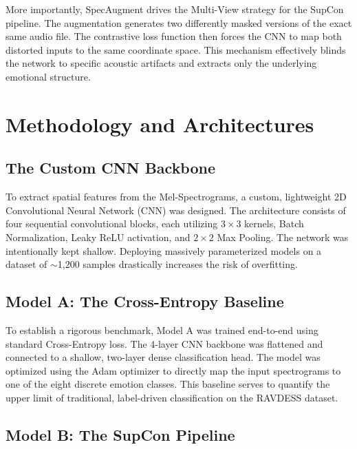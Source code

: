 \documentclass[12pt,hitec]{report}
\begin{document}
More importantly, SpecAugment drives the Multi-View strategy for the SupCon pipeline. The augmentation generates two differently masked versions of the exact same audio file. The contrastive loss function then forces the CNN to map both distorted inputs to the same coordinate space. This mechanism effectively blinds the network to specific acoustic artifacts and extracts only the underlying emotional structure.


\section{Methodology and Architectures}
\subsection{The Custom CNN Backbone}

To extract spatial features from the Mel-Spectrograms, a custom, lightweight 2D Convolutional Neural Network (CNN) was designed. The architecture consists of four sequential convolutional blocks, each utilizing $3 \times 3$ kernels, Batch Normalization, Leaky ReLU activation, and $2 \times 2$ Max Pooling. The network was intentionally kept shallow. Deploying massively parameterized models on a dataset of $\sim$1,200 samples drastically increases the risk of overfitting.


\subsection{Model A: The Cross-Entropy Baseline}
To establish a rigorous benchmark, Model A was trained end-to-end using standard Cross-Entropy loss. The 4-layer CNN backbone was flattened and connected to a shallow, two-layer dense classification head. The model was optimized using the Adam optimizer to directly map the input spectrograms to one of the eight discrete emotion classes. This baseline serves to quantify the upper limit of traditional, label-driven classification on the RAVDESS dataset.


\subsection{Model B: The SupCon Pipeline}
\end{document}
